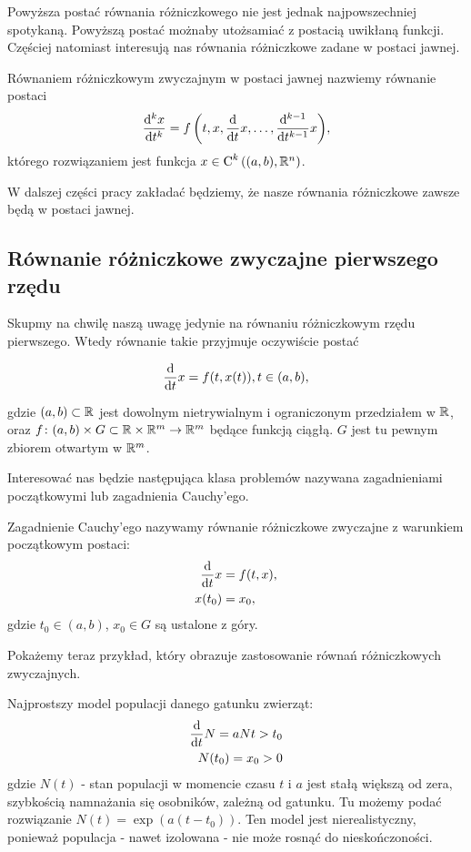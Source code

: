 \documentclass[12pt,a4paper]{report}
\begin{document}
Powyższa postać równania różniczkowego nie jest jednak najpowszechniej spotykaną. Powyższą postać możnaby utożsamiać z postacią uwikłaną funkcji. Częściej natomiast interesują nas równania różniczkowe zadane w postaci jawnej.

\begin{definition}
Równaniem różniczkowym zwyczajnym w postaci jawnej nazwiemy równanie postaci
$$
\ddx[{^k x}]{t^k} = \function{f}{t,x,\ddx{t}x, \ldots, \ddx[{^{k-1}}]{t^{k-1}} x},
$$
którego rozwiązaniem jest funkcja $x \in \Ck{k}{(a,b), \setR^n}$.
\end{definition}

W dalszej części pracy zakładać będziemy, że nasze równania różniczkowe zawsze będą w postaci jawnej.


\subsection{Równanie różniczkowe zwyczajne pierwszego rzędu}

Skupmy na chwilę naszą uwagę jedynie na równaniu różniczkowym rzędu pierwszego. Wtedy równanie takie przyjmuje oczywiście postać 

$$
\ddx{t}x = f(t,x(t)), t \in (a,b) ,
$$ 

gdzie $(a,b) \subset \setR$ jest dowolnym nietrywialnym i ograniczonym przedziałem w $\setR$, oraz $ f \colon (a,b) \times G \subset \setR \times \setR^m \to \setR^m$ będące funkcją ciągłą. $G$ jest tu pewnym zbiorem otwartym w $\setR^m$. 

Interesować nas będzie następująca klasa problemów nazywana zagadnieniami początkowymi lub zagadnienia Cauchy'ego.

\begin{problem} \label{prob-zagadnienie-cauchy}
Zagadnienie Cauchy'ego nazywamy równanie różniczkowe zwyczajne z warunkiem początkowym postaci:
\begin{align*}
\ddx{t} x &= f(t,x), \\
x(t_0) &= x_0,
\end{align*}
gdzie $t_0 \in (a,b)$, $x_0 \in G$ są ustalone z góry. 
\end{problem}

Pokażemy teraz przykład, który obrazuje zastosowanie równań różniczkowych zwyczajnych. 
\begin{example}
Najprostszy model populacji danego gatunku zwierząt:
\begin{align*}
\ddx{t}N = aN  t>t_0 \\
 N(t_0) = x_0 > 0
\end{align*}
gdzie $N(t)$ - stan populacji w momencie czasu $t$ i $a$ jest stałą większą od zera, szybkością namnażania się osobników, zależną od gatunku. Tu możemy podać rozwiązanie $N(t)=\exp(a(t-t_0))$.
\newline Ten model jest nierealistyczny, ponieważ populacja - nawet izolowana - nie może rosnąć do nieskończoności. 

\end{example}
\end{document}
